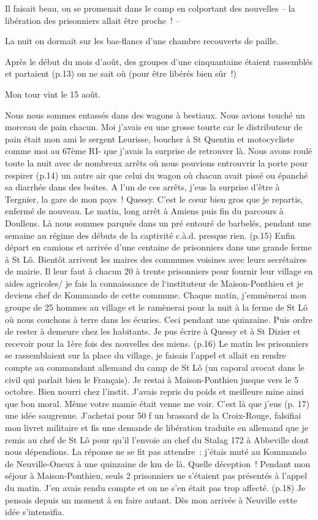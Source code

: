 \documentclass[a5paper,pagesize,10pt,bibtotoc,pointlessnumbers,
normalheadings,DIV=9,twoside=false]{scrbook}
\begin{document}
	Il faisait beau, on se promenait dans le camp en colportant des nouvelles – la libération des prisonniers allait être proche ! –
	
	La nuit on dormait sur les bas-flancs d’une chambre recouverts de paille.
	
	Après le début du mois d’août, des groupes d’une cinquantaine étaient rassemblés et partaient (p.13) on ne sait où (pour être libérés bien sûr !) 
	
	Mon tour vint le 15 août.
	
	Nous nous sommes entassés dans des wagons à bestiaux. Nous avions touché un morceau de pain chacun. Moi j’avais eu une grosse tourte car le distributeur de pain était mon ami le sergent Leurisse, boucher à St Quentin et motocycliste comme moi au 67ème RI- que j’avais la surprise de retrouver là.
	Nous avons roulé toute la nuit avec de nombreux arrêts où nous pouvions entrouvrir la porte pour respirer (p.14) un autre air que celui du wagon où chacun avait pissé ou épanché sa diarrhée dans des boites.
	A l’un de ces arrêts, j’eus la surprise d’être à Tergnier, la gare de mon pays ! Quessy. C’est le cœur bien gros que je repartis, enfermé de nouveau.
	Le matin, long arrêt à Amiens puis fin du parcours à Doullens.
	Là nous sommes parqués dans un pré entouré de barbelés, pendant une semaine au régime des débuts de la captivité c.à.d. presque rien. (p.15)
	Enfin départ en camions et arrivée d’une centaine de prisonniers dans une grande ferme à St Lô. Bientôt arrivent les maires des communes voisines avec leurs secrétaires de mairie. Il leur faut à chacun 20 à trente prisonniers pour fournir leur village en aides agricoles/ je fais la connaissance de l‘instituteur de Maison-Ponthieu et je deviens chef de Kommando de cette commune. Chaque matin, j’emmènerai mon groupe de 25 hommes au village et le ramènerai pour la nuit à la ferme de St Lô où nous couchons à terre dans les écuries. Ceci pendant une quinzaine. Puis ordre de rester à demeure chez les habitants. Je pus écrire à Quessy et à St Dizier et recevoir pour la 1ère fois des nouvelles des miens. 
	(p.16) Le matin les prisonniers se rassemblaient sur la place du village, je faisais l’appel et allait en rendre compte au commandant allemand du camp de St Lô (un caporal avocat dans le civil qui parlait bien le Français). Je restai à Maison-Ponthieu jusque vers le 5 octobre. Bien nourri chez l’instit. J’avais repris du poids et meilleure mine ainsi que bon moral. Même votre mamie était venue me voir.
	C’est là que j’eus (p. 17) une idée saugrenue. J’achetai pour 50 f un brassard de la Croix-Rouge, falsifiai mon livret militaire et fis une demande de libération traduite en allemand que je remis au chef de St Lô pour qu’il l’envoie au chef du Stalag 172 à Abbeville dont nous dépendions. La réponse ne se fit pas attendre : j’étais muté au Kommando de Neuville-Oneux à une quinzaine de km de là. Quelle déception ! Pendant mon séjour à Maison-Ponthieu, seuls 2 prisonniers ne s’étaient pas présentés à l’appel du matin. J’en avais rendu compte et on ne s’en était pas trop affecté. (p.18) Je pensais depuis un moment à en faire autant. Dès mon arrivée à Neuville cette idée s’intensifia.
\end{document}
